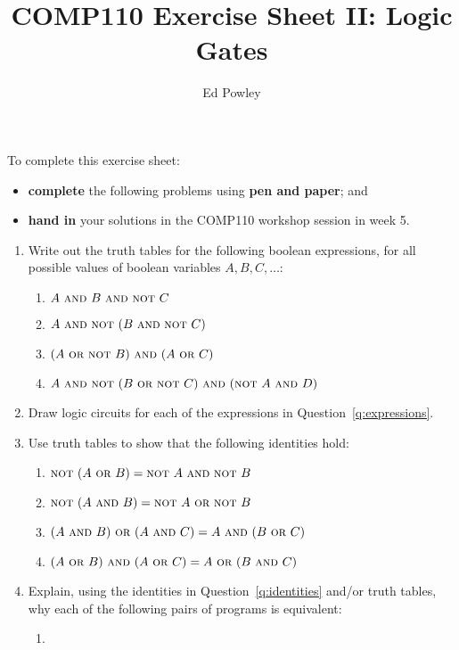 \documentclass{../../../fal_assignment}
\title{COMP110 Exercise Sheet II: Logic Gates}
\author{Ed Powley}
\newcommand{\OP}[1]{\ \textsc{#1}\ }
\newcommand{\OPand}{\OP{and}}
\newcommand{\OPor}{\OP{or}}
\newcommand{\OPnot}{\textsc{not}\ }
\begin{document}
\maketitle

To complete this exercise sheet:
\begin{itemize}
    \item \textbf{complete} the following problems using \textbf{pen and paper}; and
    \item \textbf{hand in} your solutions in the COMP110 workshop session in week 5.
\end{itemize}

\begin{enumerate}
    \item \label{q:expressions} Write out the truth tables for the following boolean expressions, for all possible values of boolean variables
        $A, B, C, \dots$:
        \begin{enumerate}
            \item $A \OPand B \OPand \OPnot C$
            \item $A \OPand \OPnot(B \OPand \OPnot C)$
            \item $(A \OPor \OPnot B) \OPand (A \OPor C)$
            \item $A \OPand \OPnot (B \OPor \OPnot C) \OPand (\OPnot A \OPand D)$
        \end{enumerate}
    \item Draw logic circuits for each of the expressions in Question~\ref{q:expressions}.
    \item \label{q:identities} Use truth tables to show that the following identities hold:
        \begin{enumerate}
            \item $\OPnot (A \OPor B) = \OPnot A \OPand \OPnot B$
            \item $\OPnot (A \OPand B) = \OPnot A \OPor \OPnot B$
            \item $(A \OPand B) \OPor (A \OPand C) = A \OPand (B \OPor C)$
            \item $(A \OPor B) \OPand (A \OPor C) = A \OPor (B \OPand C)$
        \end{enumerate}
    \item Explain, using the identities in Question~\ref{q:identities} and/or truth tables,    
        why each of the following pairs of programs is equivalent:
        \begin{enumerate}
            \item {\ }

\end{enumerate}
\end{enumerate}
\end{document}
